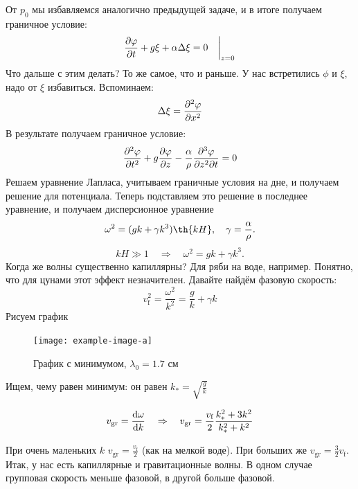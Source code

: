 От $p_0$ мы избавляемся аналогично предыдущей задаче, и в итоге получаем граничное условие:
\begin{equation}
    \pdv{\varphi}{t}+g\xi+\alpha\Delta\xi = 0 \quad\bigg|_{z = 0}
\end{equation}
Что дальше с этим делать? То же самое, что и раньше. У нас встретились $\phi$ и $\xi$, надо от $\xi$ избавиться. Вспоминаем:
\begin{equation}
    \Delta\xi = \pdv[2]{\varphi}{x}
\end{equation}
В результате получаем граничное условие:
\begin{equation}
    \pdv[2]{\varphi}{t}+g\pdv{\varphi}{z}-\frac{\alpha}{\rho}\frac{\partial^3\varphi}{\partial z^2 \partial t} = 0
\end{equation}
Решаем уравнение Лапласа, учитываем граничные условия на дне, и получаем  решение для потенциала. Теперь подставляем это решение в последнее уравнение, и получаем дисперсионное уравнение
\begin{equation}
    \omega^2 = (gk+\gamma k^3)\th{kH}, \quad \gamma = \frac{\alpha}{\rho}.
\end{equation}
\begin{equation}
    kH \gg 1 \quad \Rightarrow \quad \omega^2 = gk+\gamma k^3.
\end{equation}
Когда же волны существенно капиллярны? Для ряби на воде, например. Понятно, что для цунами этот эффект незначителен. Давайте найдём фазовую скорость:
\begin{equation}
    v_\text{f}^2 = \frac{\omega^2}{k^2} = \frac{g}{k}+\gamma k 
\end{equation}
Рисуем график

\begin{figure}[H]
    \centering
    \texttt{[image: example-image-a]}
    \caption{График с минимумом, $\lambda_0 = 1.7 \text{ см}$}
    \label{fig:figure1}
\end{figure}

Ищем, чему равен минимум: он равен $k_{*} = \sqrt{\frac{g}{k}}$

\begin{equation}
    v_\text{gr} = \dv{\omega}{k} \quad \Rightarrow \quad 
    v_\text{gr} = \frac{v_\text{f}}{2}\frac{k_{*}^2+3k^2}{k_{*}^2+k^2}
\end{equation}

При очень маленьких $k$ $v_\text{gr} = \frac{v_\text{f}}{2}$ (как на мелкой воде). 
При больших же $v_\text{gr} = \frac{3}{2}v_\text{f}$.
Итак, у нас есть капиллярные и гравитационные волны.
В одном случае групповая скорость меньше фазовой, в другой больше фазовой. 

